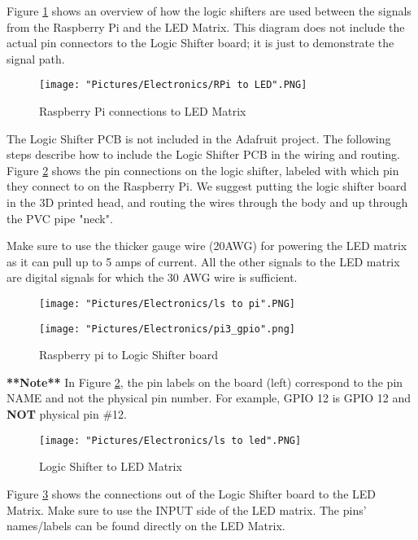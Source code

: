 \documentclass[12pt]{article}
\begin{document}
\noindent Figure \ref{rpi2led} shows an overview of how the logic shifters are used between the signals from the Raspberry Pi and the LED Matrix. This diagram does not include the actual pin connectors to the Logic Shifter board; it is just to demonstrate the signal path.

\begin{figure}[H]
 	\centering
	\texttt{[image: "Pictures/Electronics/RPi to LED".PNG]}
 	\caption{Raspberry Pi connections to LED Matrix}
	\label{rpi2led}
\end{figure}


\noindent The Logic Shifter PCB is not included in the Adafruit project. The following steps describe how to include the Logic Shifter PCB in the wiring and routing. Figure \ref{ls2pi} shows the pin connections on the logic shifter, labeled with which pin they connect to on the Raspberry Pi. We suggest putting the logic shifter board in the 3D printed head, and routing the wires through the body and up through the PVC pipe "neck". 

\noindent Make sure to use the thicker gauge wire (20AWG) for powering the LED matrix as it can pull up to 5 amps of current. All the other signals to the LED matrix are digital signals for which the 30 AWG wire is sufficient. 

\begin{figure}[H]
 	\centering
  	\begin{minipage}[b]{0.45\textwidth}
		\texttt{[image: "Pictures/Electronics/ls to pi".PNG]}
  	\end{minipage}
  	\hfill
  	\begin{minipage}[b]{0.45\textwidth}
    		\texttt{[image: "Pictures/Electronics/pi3\_gpio".png]}
  	\end{minipage}
	\caption{Raspberry pi to Logic Shifter board}
	\label{ls2pi}
\end{figure}

\textbf{**Note**} In Figure \ref{ls2pi}, the pin labels on the board (left) correspond to the pin NAME and not the physical pin number. For example, GPIO 12 is GPIO 12 and \textbf{NOT} physical pin \#12.

\begin{figure}[H]
 	\centering
	\texttt{[image: "Pictures/Electronics/ls to led".PNG]}
 	\caption{Logic Shifter to LED Matrix}
	\label{ls2led}
\end{figure}

Figure \ref{ls2led} shows the connections out of the Logic Shifter board to the LED Matrix. Make sure to use the INPUT side of the LED matrix. The pins' names/labels can be found directly on the LED Matrix.  
\end{document}
